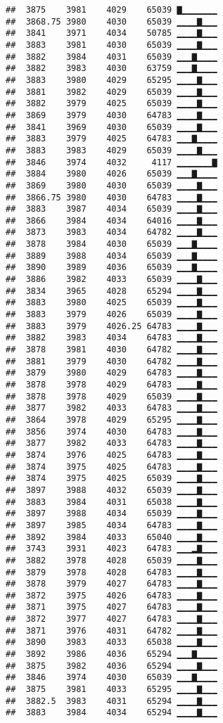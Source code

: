 \documentclass[]{article}
\begin{document}
\begin{verbatim}
##  3875    3981    4029    65039 ▇▁▁▁▁▁▁▁
##  3868.75 3980    4030    65039 ▁▁▁▁▇▁▁▁
##  3841    3971    4034    50785 ▁▁▁▁▇▁▁▁
##  3883    3981    4030    65039 ▁▁▁▁▇▁▁▁
##  3882    3984    4031    65039 ▁▁▁▇▁▁▁▁
##  3882    3983    4030    63759 ▁▁▁▇▁▁▁▁
##  3883    3980    4029    65295 ▁▁▁▁▇▁▁▁
##  3881    3982    4029    65039 ▁▁▁▁▇▁▁▁
##  3882    3979    4025    65039 ▁▁▁▁▇▁▁▁
##  3869    3979    4030    64783 ▁▁▁▁▇▁▁▁
##  3841    3969    4030    65039 ▁▁▁▁▇▁▁▁
##  3883    3979    4025    64783 ▁▁▁▇▁▁▁▁
##  3883    3983    4029    65039 ▁▁▁▁▇▁▁▁
##  3846    3974    4032     4117 ▁▁▁▁▁▁▁▇
##  3884    3980    4026    65039 ▁▁▁▇▁▁▁▁
##  3869    3980    4030    65039 ▁▁▁▁▇▁▁▁
##  3866.75 3980    4030    64783 ▁▁▁▁▇▁▁▁
##  3883    3987    4034    65039 ▁▁▁▁▇▁▁▁
##  3866    3984    4034    64016 ▁▁▁▁▇▁▁▁
##  3873    3983    4034    64782 ▁▁▁▁▇▁▁▁
##  3878    3984    4030    65039 ▁▁▁▇▁▁▁▁
##  3889    3988    4034    65039 ▁▁▁▇▁▁▁▁
##  3890    3989    4036    65039 ▁▁▁▇▁▁▁▁
##  3886    3982    4033    65039 ▁▁▁▁▇▁▁▁
##  3834    3965    4028    65294 ▁▁▁▁▇▁▁▁
##  3883    3980    4025    65039 ▁▁▁▁▇▁▁▁
##  3883    3979    4026    65039 ▁▁▁▁▇▁▁▁
##  3883    3979    4026.25 64783 ▁▁▁▁▇▁▁▁
##  3882    3983    4034    64783 ▁▁▁▁▇▁▁▁
##  3878    3981    4030    64782 ▁▁▁▁▇▁▁▁
##  3881    3979    4030    64782 ▁▁▁▁▇▁▁▁
##  3879    3980    4029    64783 ▁▁▁▁▇▁▁▁
##  3878    3978    4029    64783 ▁▁▁▁▇▁▁▁
##  3878    3978    4029    65039 ▁▁▁▁▇▁▁▁
##  3877    3982    4033    64783 ▁▁▁▁▇▁▁▁
##  3864    3978    4029    65295 ▁▁▁▁▇▁▁▁
##  3856    3974    4030    64783 ▁▁▁▁▇▁▁▁
##  3877    3982    4033    64783 ▁▁▁▁▇▁▁▁
##  3874    3976    4025    64783 ▁▁▁▁▇▁▁▁
##  3874    3975    4025    64783 ▁▁▁▁▇▁▁▁
##  3874    3975    4025    65039 ▁▁▁▁▇▁▁▁
##  3897    3988    4032    65039 ▁▁▁▁▇▁▁▁
##  3883    3984    4031    65038 ▁▁▁▁▇▁▁▁
##  3897    3988    4034    65039 ▁▁▁▁▇▁▁▁
##  3897    3985    4034    64783 ▁▁▁▁▇▁▁▁
##  3892    3984    4033    65040 ▁▁▁▁▇▁▁▁
##  3743    3931    4023    64783 ▁▁▁▂▇▁▁▁
##  3882    3978    4028    65039 ▁▁▁▁▇▁▁▁
##  3879    3978    4028    64783 ▁▁▁▁▇▁▁▁
##  3878    3979    4027    64783 ▁▁▁▁▇▁▁▁
##  3872    3975    4026    64783 ▁▁▁▁▇▁▁▁
##  3871    3975    4027    64783 ▁▁▁▁▇▁▁▁
##  3872    3977    4027    64783 ▁▁▁▁▇▁▁▁
##  3871    3976    4031    64782 ▁▁▁▁▇▁▁▁
##  3890    3983    4033    65038 ▁▁▁▁▇▁▁▁
##  3892    3986    4036    65294 ▁▁▁▇▁▁▁▁
##  3875    3982    4036    65294 ▁▁▁▁▇▁▁▁
##  3846    3974    4030    65039 ▁▁▁▇▁▁▁▁
##  3875    3981    4033    65295 ▁▁▁▁▇▁▁▁
##  3882.5  3983    4031    65294 ▁▁▁▁▇▁▁▁
##  3883    3984    4034    65294 ▁▁▁▁▇▁▁▁

\end{verbatim}
\end{document}
